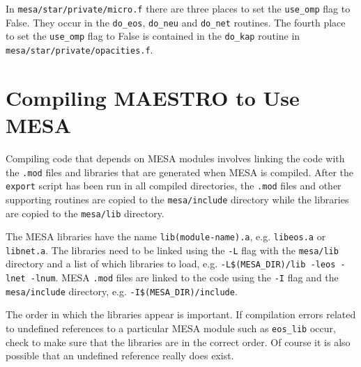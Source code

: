 In {\tt mesa/star/private/micro.f} there are three places 
to set the {\tt use\_omp} flag to False. They occur in the {\tt do\_eos}, 
{\tt do\_neu} and {\tt do\_net} routines. The fourth place to set the 
{\tt use\_omp} flag to False is contained in the {\tt do\_kap} routine in 
{\tt mesa/star/private/opacities.f}.

\section{Compiling {\sf MAESTRO} to Use {\sf MESA}}

Compiling code that depends on {\sf MESA} modules involves linking the code 
with the {\tt .mod} files and libraries that are generated when {\sf MESA} 
is compiled. After the {\tt export} script has been run in all compiled 
directories, the {\tt .mod} files and other supporting routines are 
copied to the {\tt mesa/include} directory while the libraries are copied to 
the {\tt mesa/lib} directory.

The {\sf MESA} libraries have the name {\tt lib(module-name).a}, e.g. 
{\tt libeos.a} or {\tt libnet.a}. The libraries need to be linked using the 
{\tt -L} flag with the {\tt mesa/lib} directory and a list of which libraries 
to load, e.g. {\tt -L\$(MESA\_DIR)/lib -leos -lnet -lnum}. {\sf MESA} 
{\tt .mod} files are linked to the code using the {\tt -I} flag and the 
{\tt mesa/include} directory, e.g. {\tt -I\$(MESA\_DIR)/include}. 

The order in which the libraries appear is important. If compilation errors 
related to undefined references to a particular {\sf MESA} module such as 
{\tt eos\_lib} occur, check to make sure that the libraries are in the correct 
order. Of course it is also possible that an undefined reference really does 
exist.

